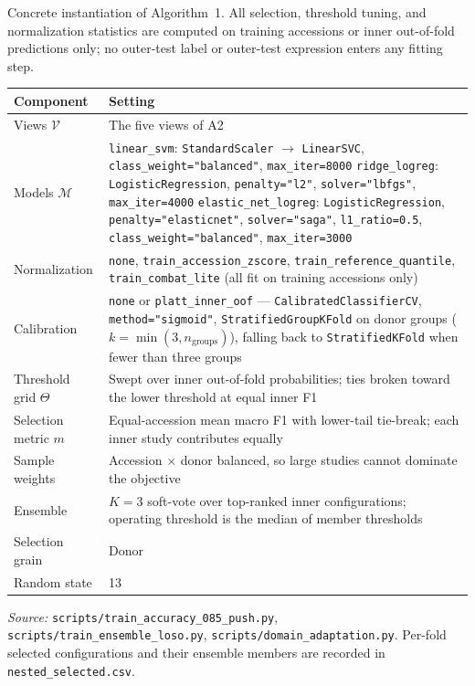Concrete instantiation of Algorithm~1. All selection, threshold tuning, and
normalization statistics are computed on training accessions or inner
out-of-fold predictions only; no outer-test label or outer-test expression
enters any fitting step.

{\small
\begin{tabular}{@{}lp{9.2cm}@{}}
\toprule
Component & Setting \\
\midrule
Views $\mathcal{V}$ & The five views of A2 \\
Models $\mathcal{M}$ & \texttt{linear\_svm}: \texttt{StandardScaler} $\to$ \texttt{LinearSVC}, \texttt{class\_weight="balanced"}, \texttt{max\_iter=8000}\newline
\texttt{ridge\_logreg}: \texttt{LogisticRegression}, \texttt{penalty="l2"}, \texttt{solver="lbfgs"}, \texttt{max\_iter=4000}\newline
\texttt{elastic\_net\_logreg}: \texttt{LogisticRegression}, \texttt{penalty="elasticnet"}, \texttt{solver="saga"}, \texttt{l1\_ratio=0.5}, \texttt{class\_weight="balanced"}, \texttt{max\_iter=3000} \\
Normalization & \texttt{none}, \texttt{train\_accession\_zscore}, \texttt{train\_reference\_quantile}, \texttt{train\_combat\_lite} (all fit on training accessions only) \\
Calibration & \texttt{none} or \texttt{platt\_inner\_oof} --- \texttt{CalibratedClassifierCV}, \texttt{method="sigmoid"}, \texttt{StratifiedGroupKFold} on donor groups ($k=\min(3,n_{\text{groups}})$), falling back to \texttt{StratifiedKFold} when fewer than three groups \\
Threshold grid $\Theta$ & Swept over inner out-of-fold probabilities; ties broken toward the lower threshold at equal inner F1 \\
Selection metric $m$ & Equal-accession mean macro F1 with lower-tail tie-break; each inner study contributes equally \\
Sample weights & Accession $\times$ donor balanced, so large studies cannot dominate the objective \\
Ensemble & $K=3$ soft-vote over top-ranked inner configurations; operating threshold is the median of member thresholds \\
Selection grain & Donor \\
Random state & 13 \\
\bottomrule
\end{tabular}
}

\medskip
\noindent\textit{Source:} \texttt{scripts/train\_accuracy\_085\_push.py},
\texttt{scripts/train\_ensemble\_loso.py}, \texttt{scripts/domain\_adaptation.py}.
Per-fold selected configurations and their ensemble members are recorded in
\texttt{nested\_selected.csv}.

